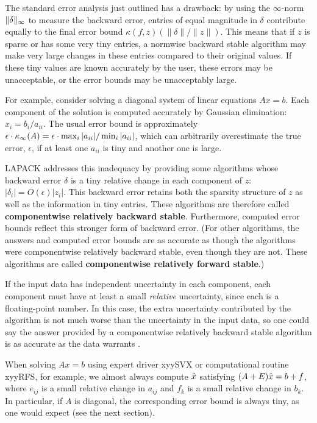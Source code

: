 The standard error analysis just outlined has a drawback: by using the
$\infty$-norm $\| \delta \|_{\infty}$ to measure the backward error,
entries of equal magnitude in $\delta$ contribute equally to the final
error bound $\kappa (f,z) (\| \delta \|/\|z\|)$. This means that
if $z$ is sparse or has some very tiny entries, a normwise backward
stable algorithm may make very large changes in these entries
compared to their original values. If these tiny values are known accurately
by the user, these errors may be unacceptable,
or the error bounds may be unacceptably large.

For example, consider solving a diagonal system of linear equations $Ax=b$.
Each component of the solution is computed accurately by
Gaussian elimination: $x_i = b_i / a_{ii}$.
The usual error bound is approximately
$\epsilon \cdot \kappa_{\infty} (A) = \epsilon \cdot \max_i |a_{ii}| / \min_i |a_{ii}|$,
which can arbitrarily overestimate the true error, $\epsilon$, if at least one
$a_{ii}$ is tiny and another one is large.

LAPACK addresses this inadequacy by providing some algorithms
whose backward error $\delta$ is a tiny relative change in
each component of $z$: $| \delta_{i} | = O( \epsilon ) | z_{i} |$.
This backward error retains both the sparsity structure of $z$ as
well as the information in tiny entries. These algorithms are therefore
called {\bf componentwise relatively backward stable}.
Furthermore, computed error bounds reflect this stronger form of backward
error.
(For other algorithms, the answers and computed error bounds
are as accurate as though the algorithms were componentwise relatively backward
stable, even though they are not. These algorithms are called
{\bf componentwise relatively forward stable}.)

If the input data has independent uncertainty in each component,
each component must have at least a small {\em relative} uncertainty,
since each is a floating-point number.
In this case, the extra uncertainty contributed by the algorithm is not much
worse than the uncertainty in the input data, so
one could say the answer provided by a componentwise
relatively backward stable algorithm is as accurate as the data
warrants \cite{lawn20}.

When solving $Ax=b$ using expert driver xyySVX or computational routine xyyRFS,
for example, we almost always
compute  $\hat{x}$ satisfying $(A+E) \hat{x} = b+f$, where
$e_{ij}$ is a small relative change in $a_{ij}$ and
$f_k$ is a small relative change in $b_k$. In particular, if $A$ is diagonal,
the corresponding error bound is always tiny, as one would
expect (see the next section).

